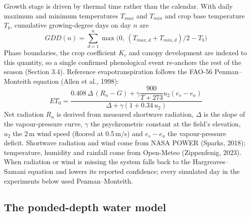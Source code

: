 \documentclass[11pt,a4paper]{article}
\begin{document}
Growth stage is driven by thermal time rather than the calendar. With daily maximum and minimum temperatures $T_{max}$ and $T_{min}$ and crop base temperature $T_b$, cumulative growing-degree days on day $n$ are
\begin{equation}
GDD(n) = \sum_{d=1}^{n} \max\!\big(0,\ (T_{max,d}+T_{min,d})/2 - T_b\big)
\end{equation}
Phase boundaries, the crop coefficient $K_c$ and canopy development are indexed to this quantity, so a single confirmed phenological event re-anchors the rest of the season (Section 3.4). Reference evapotranspiration follows the FAO-56 Penman--Monteith equation (Allen et al., 1998):
\begin{equation}
ET_0 = \frac{0.408\,\Delta\,(R_n - G) + \gamma \dfrac{900}{T+273} u_2 (e_s - e_a)}{\Delta + \gamma (1 + 0.34\,u_2)}
\end{equation}
Net radiation $R_n$ is derived from measured shortwave radiation, $\Delta$ is the slope of the vapour-pressure curve, $\gamma$ the psychrometric constant at the field's elevation, $u_2$ the 2\,m wind speed (floored at 0.5\,m/s) and $e_s-e_a$ the vapour-pressure deficit. Shortwave radiation and wind come from NASA POWER (Sparks, 2018); temperature, humidity and rainfall come from Open-Meteo (Zippenfenig, 2023). When radiation or wind is missing the system falls back to the Hargreaves--Samani equation and lowers its reported confidence; every simulated day in the experiments below used Penman--Monteith.

\subsection{The ponded-depth water model}
\label{sec:paddy}
\end{document}
